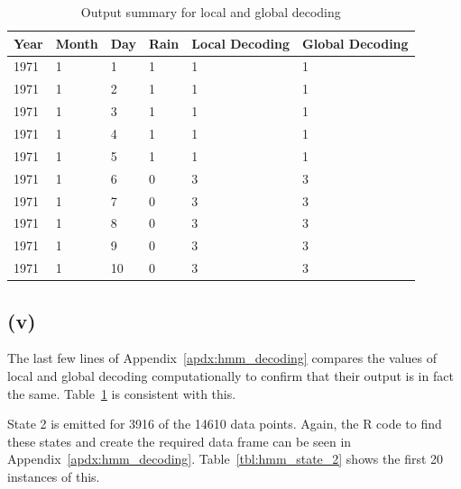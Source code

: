 \documentclass{article}
\begin{document}
\begin{table}[]
  \centering
  \begin{tabular}{llllll}
    \toprule
    Year & Month & Day & Rain & Local Decoding & Global Decoding \\
    \midrule
    1971 & 1     & 1   & 1    & 1              & 1       \\
    1971 & 1     & 2   & 1    & 1              & 1       \\
    1971 & 1     & 3   & 1    & 1              & 1       \\
    1971 & 1     & 4   & 1    & 1              & 1       \\
    1971 & 1     & 5   & 1    & 1              & 1       \\
    1971 & 1     & 6   & 0    & 3              & 3       \\
    1971 & 1     & 7   & 0    & 3              & 3       \\
    1971 & 1     & 8   & 0    & 3              & 3       \\
    1971 & 1     & 9   & 0    & 3              & 3       \\
    1971 & 1     & 10  & 0    & 3              & 3       \\
  \bottomrule
  \end{tabular}
  \caption{Output summary for local and global decoding}\label{tbl:hmm_decoding}
\end{table}

\subsection*{(v)}

The last few lines of Appendix~\ref{apdx:hmm_decoding} compares the
values of local and global decoding computationally to confirm that
their output is in fact the same. Table~\ref{tbl:hmm_decoding} is
consistent with this.

State 2 is emitted for 3916 of the 14610 data points. Again, the R
code to find these states and create the required data frame can be
seen in Appendix~\ref{apdx:hmm_decoding}. Table~\ref{tbl:hmm_state_2}
shows the first 20 instances of this.
\end{document}
